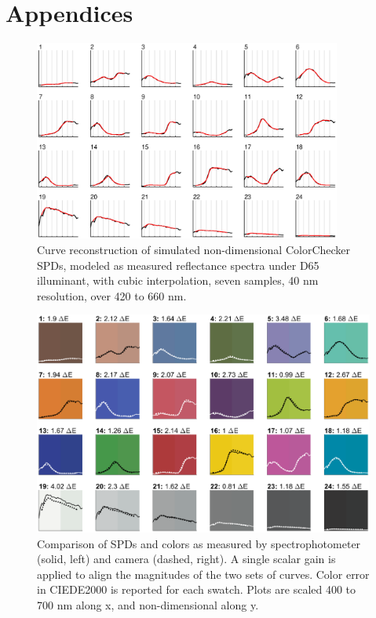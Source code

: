 \documentclass[twocolumn,10pt]{asme2ej}
\begin{document}
 

\clearpage 
\onecolumn
\section{Appendices}

\begin{figure}[H]
\begin{centering}
\includegraphics[width=0.90\textwidth]{colorchecker_reconstruction.eps}
\caption{Curve reconstruction of simulated non-dimensional ColorChecker SPDs, modeled as measured reflectance spectra under D65 illuminant, with cubic interpolation, seven samples, 40 nm resolution, over 420 to 660 nm.}
\label{colorchecker_reconstruction}
\end{centering}
\end{figure}

\begin{figure}[H]
\centering
  \includegraphics[width=0.90\linewidth]{SPD_validation.eps}
  \caption{Comparison of SPDs and colors as measured by spectrophotometer (solid, left) and camera (dashed, right). A single scalar gain is applied to align the magnitudes of the two sets of curves. Color error in CIEDE2000 is reported for each swatch. Plots are scaled 400 to 700 nm along x, and non-dimensional along y.}
  \label{SPD_validation}
\end{figure}
\end{document}
